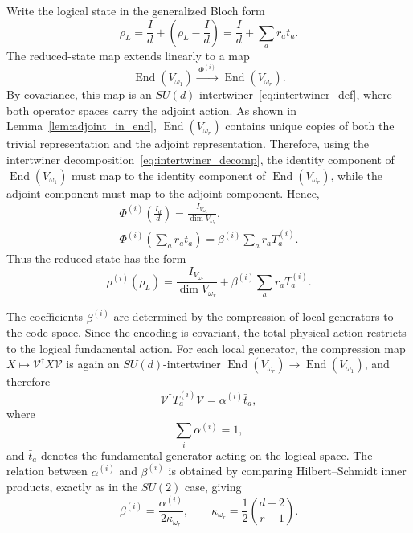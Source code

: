 \documentclass[10pt,twocolumn,superscriptaddress,aps,amsmath,amssymb,citeautoscript,floatfix,prx]{revtex4-2}
\theoremstyle{plain}
\theoremstyle{plain}
\theoremstyle{plain}
\theoremstyle{plain}
\theoremstyle{plain}
\theoremstyle{plain}
\theoremstyle{plain}
\theoremstyle{definition}
\theoremstyle{plain}
\begin{document}
Write the logical state in the generalized Bloch form
\begin{equation}\label{eq:general_bloch}
\rho_L
=
\frac{I}{d}
+
\left(\rho_L-\frac{I}{d}\right)
=
\frac{I}{d}
+
\sum_a r_a t_a .
\end{equation}
The reduced-state map extends linearly to a map
$$
    \operatorname{End}(V_{\omega_1})
    \xrightarrow{\;\Phi^{(i)}\;}
    \operatorname{End}(V_{\omega_r}) .
$$
By covariance, this map is an $SU(d)$-intertwiner~\eqref{eq:intertwiner_def}, where both operator spaces carry the adjoint action. 
As shown in Lemma~\ref{lem:adjoint_in_end}, $\operatorname{End}(V_{\omega_r})$ contains unique copies of both the trivial representation and the adjoint representation. 
Therefore, using the intertwiner decomposition~\eqref{eq:intertwiner_decomp}, the identity component of $\operatorname{End}(V_{\omega_1})$ must map 
to the identity component of $\operatorname{End}(V_{\omega_r})$, while the adjoint component must map to the adjoint component. Hence,
\begin{equation}\label{eq:linear_ext_of_red_state}
\begin{gathered}
\Phi^{(i)}\left(\frac{I_d}{d}\right)
=
\frac{I_{V_{\omega_r}}}{\dim V_{\omega_r}},
\\
\Phi^{(i)}\left(\sum_a r_a t_a\right)
=
\beta^{(i)}
\sum_a r_a T_a^{(i)} .
\end{gathered}
\end{equation}
Thus the reduced state has the form
\begin{equation}\label{eq:reduced_state_sud}
\rho^{(i)}(\rho_L)
=
\frac{I_{V_{\omega_r}}}{\dim V_{\omega_r}}
+
\beta^{(i)}
\sum_a r_a T_a^{(i)}.
\end{equation}

The coefficients $\beta^{(i)}$ are determined by the compression of local generators to the code space. Since the encoding is covariant, 
the total physical action restricts to the logical fundamental action. For each local generator, the compression map $X\mapsto \mathcal{V}^\dagger X \mathcal{V}$ is again 
an $SU(d)$-intertwiner $\operatorname{End}(V_{\omega_r})\rightarrow \operatorname{End}(V_{\omega_1})$, and therefore
$$
\mathcal{V}^\dagger T_a^{(i)}\mathcal{V}
=
\alpha^{(i)}\bar t_a ,
$$
where
$$
\sum_i\alpha^{(i)}=1,
$$
and $\bar t_a$ denotes the fundamental generator acting on the logical space. The relation between $\alpha^{(i)}$ and $\beta^{(i)}$ 
is obtained by comparing Hilbert--Schmidt inner products, exactly as in the $SU(2)$ case, giving
$$
\beta^{(i)}
=
\frac{\alpha^{(i)}}{2\kappa_{\omega_r}},
\qquad
\kappa_{\omega_r}
=
\frac12\binom{d-2}{r-1}.
$$
\end{document}
